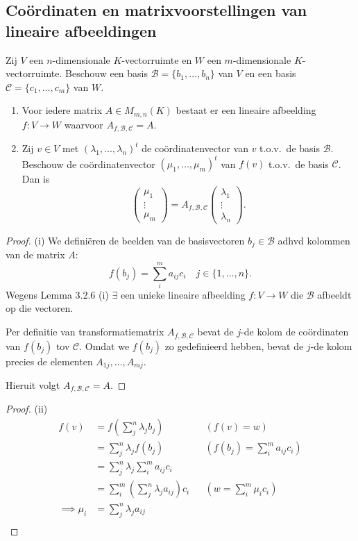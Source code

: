 \subsection{Coördinaten en matrixvoorstellingen van lineaire afbeeldingen}

\begin{lemma}[4.1.4]
    Zij $V$ een $n$-dimensionale $K$-vectorruimte en $W$ een $m$-dimensionale $K$-vectorruimte.
    Beschouw een basis $\mathcal{B} = \{b_1, \dots, b_n\}$ van $V$ en een basis $\mathcal{C} = \{c_1, \dots, c_m\}$ van $W$.
    \begin{enumerate}
        \item[(i)] Voor iedere matrix $A \in M_{m,n}(K)$ bestaat er een lineaire afbeelding $f \colon V \to W$ waarvoor $A_{f,\mathcal{B},\mathcal{C}} = A$.
        \item[(ii)] Zij $v \in V$ met $(\lambda_1, \dots, \lambda_n)^t$ de coördinatenvector van $v$ t.o.v.\ de basis $\mathcal{B}$.
        Beschouw de coördinatenvector $(\mu_1, \dots, \mu_m)^t$ van $f(v)$ t.o.v.\ de basis $\mathcal{C}$.
        Dan is \[ \begin{pmatrix} \mu_1 \\ \vdots \\ \mu_m \end{pmatrix} = A_{f,\mathcal{B},\mathcal{C}} \begin{pmatrix} \lambda_1 \\ \vdots \\ \lambda_n \end{pmatrix}. \]
    \end{enumerate}
\end{lemma}
\begin{proof}(i)
    We definiëren de beelden van de basisvectoren $b_j \in \mathcal{B}$ adhvd kolommen van de matrix $A$:
    \[f(b_j) = \sum_{i}^m a_{ij} c_i \quad  j \in \{ 1, \dots, n\}.\]
    Wegens Lemma 3.2.6 (i) \(\exists\) een unieke lineaire afbeelding $f \colon V \to W$ die $\mathcal{B}$ afbeeldt op die vectoren.

    Per definitie van transformatiematrix $A_{f,\mathcal{B},\mathcal{C}}$ bevat
    de $j$-de kolom de coördinaten van $f(b_j)$ tov $\mathcal{C}$.
    Omdat we $f(b_j)$ zo gedefinieerd hebben, bevat de $j$-de kolom
    precies de elementen $A_{1j}, \dots, A_{mj}$.

    Hieruit volgt $A_{f,\mathcal{B},\mathcal{C}} = A$.
\end{proof}
\begin{proof}(ii)
    \begin{align*}
        f(v)
        &= f\left(\sum_j^n\lambda_j b_j\right) && (f(v) = w)\\
        &= \sum_j^n\lambda_j f\left(b_j\right) && (f(b_j) = \sum_{i}^m a_{ij} c_i)\\
        &= \sum_j^n\lambda_j \sum_{i}^m a_{ij} c_i\\
        &= \sum_i^m\left(\sum_j^n\lambda_j  a_{ij}\right) c_i && (w = \sum_i^m \mu_i c_i)\\
        \implies \mu_i &= \sum_j^n\lambda_j a_{ij} \\
    \end{align*}
\end{proof}

